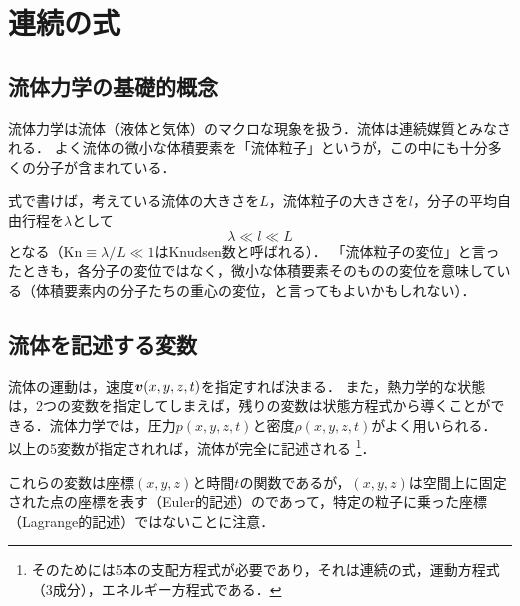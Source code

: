 \section{連続の式}
\subsection*{流体力学の基礎的概念}
流体力学は流体（液体と気体）のマクロな現象を扱う．流体は連続媒質とみなされる．
よく流体の微小な体積要素を「流体粒子」というが，この中にも十分多くの分子が含まれている．

式で書けば，考えている流体の大きさを$L$，流体粒子の大きさを$l$，分子の平均自由行程を$\lambda$として
\[
    \lambda \ll l \ll L
\]
となる（$\mathrm{Kn} \equiv \lambda/L \ll 1$はKnudsen数と呼ばれる）．
「流体粒子の変位」と言ったときも，各分子の変位ではなく，微小な体積要素そのものの変位を意味している（体積要素内の分子たちの重心の変位，と言ってもよいかもしれない）．


\subsection*{流体を記述する変数}
流体の運動は，速度$\vb*{v}(x,y,z,t)$を指定すれば決まる．
また，熱力学的な状態は，2つの変数を指定してしまえば，残りの変数は状態方程式から導くことができる．流体力学では，圧力$p(x,y,z,t)$と密度$\rho(x,y,z,t)$がよく用いられる．
以上の5変数が指定されれば，流体が完全に記述される
\footnote{そのためには5本の支配方程式が必要であり，それは連続の式，運動方程式（3成分），エネルギー方程式である．}．

これらの変数は座標$(x,y,z)$と時間$t$の関数であるが，$(x,y,z)$は空間上に固定された点の座標を表す（Euler的記述）のであって，特定の粒子に乗った座標（Lagrange的記述）ではないことに注意．

